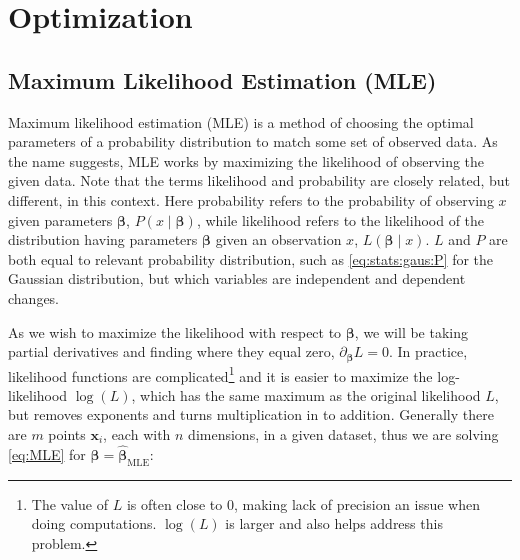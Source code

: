 \chapter{Optimization}
\label{chap:opt}

\section{Maximum Likelihood Estimation (MLE)}
\label{opt:MLE}

Maximum likelihood estimation (MLE) is a method
of choosing the optimal parameters of a probability distribution
to match some set of observed data.
As the name suggests, MLE works by maximizing the likelihood of observing the given data.
Note that the terms likelihood and probability are closely related, but different, in this context.
Here probability refers to the probability of observing $x$ given parameters $\bm{\beta}$, $P\left(x \mid \bm{\beta}\right)$,
while likelihood refers to the likelihood of the distribution having parameters $\bm{\beta}$ given an observation $x$, $L\left(\bm{\beta} \mid x\right)$.
$L$ and $P$ are both equal to relevant probability distribution,
such as \cref{eq:stats:gaus:P} for the Gaussian distribution,
but which variables are independent and dependent changes.

As we wish to maximize the likelihood with respect to $\bm{\beta}$,
we will be taking partial derivatives and finding where they equal zero, $\partial_{\bm{\beta}} L = 0$.
In practice, likelihood functions are complicated\footnote{The value of $L$
is often close to $0$, making lack of precision an issue when doing computations.
$\log\left(L\right)$ is larger and also helps address this problem.} and
it is easier to maximize the log-likelihood $\log\left(L\right)$,
which has the same maximum as the original likelihood $L$,
but removes exponents and turns multiplication in to addition.
Generally there are $m$ points $\mathbf{x}_{i}$, each with $n$ dimensions, in a given dataset,
thus we are solving \cref{eq:MLE} for $\bm{\beta} = \hat{\bm{\beta}}_{\text{MLE}}$:

